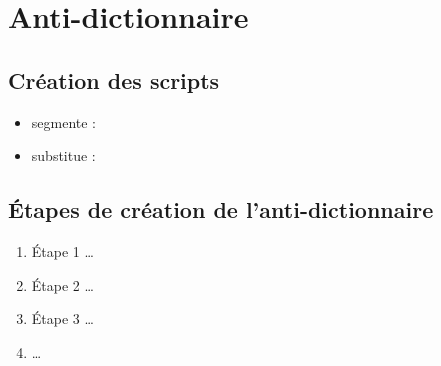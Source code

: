 \chapter{Anti-dictionnaire}
    \lipsum[1]

\section{Création des scripts}
\begin{itemize}
    \item segmente :
    \item substitue :
\end{itemize}
    
\section{Étapes de création de l'anti-dictionnaire}
    \begin{enumerate}
        \item Étape 1 \ldots
        \item Étape 2 \ldots
        \item Étape 3 \ldots
        \item \ldots
    \end{enumerate}